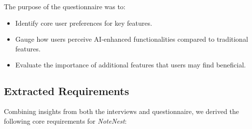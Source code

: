 \documentclass[a4paper, 12pt]{article}
\begin{document}
The purpose of the questionnaire was to:
\begin{itemize}
    \item Identify core user preferences for key features.
    \item Gauge how users perceive AI-enhanced functionalities compared to traditional features.
    \item Evaluate the importance of additional features that users may find beneficial.
\end{itemize}

\subsection{Extracted Requirements}
Combining insights from both the interviews and questionnaire, we derived the following core requirements for \textit{NoteNest}:
\end{document}
